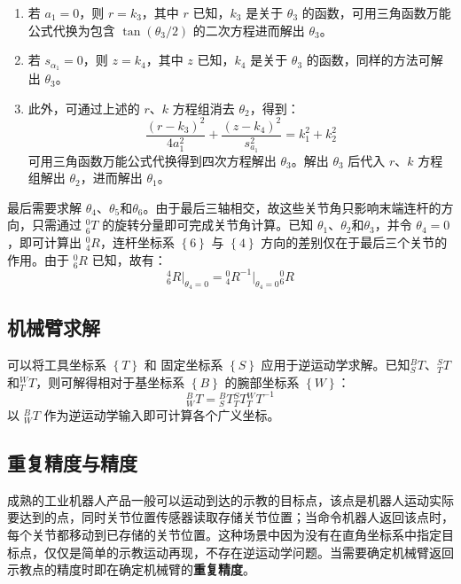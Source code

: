 \documentclass[cn,11pt,chinese,blue,bibstyle=ieeetr]{elegantbook}
\begin{document}
\begin{enumerate}
	\item 若 $a_1=0$，则 $r=k_3$，其中 $r$ 已知，$k_3$ 是关于 $\theta_3$ 的函数，可用三角函数万能公式代换为包含 $\tan(\theta_3/2)$ 的二次方程进而解出 $\theta_3$。
	\item 若 $s_{\alpha_1}=0$，则 $z=k_4$，其中 $z$ 已知，$k_4$ 是关于 $\theta_3$ 的函数，同样的方法可解出 $\theta_3$。
	\item 此外，可通过上述的 $r$、$k$ 方程组消去 $\theta_2$，得到：
	\begin{equation}
		\frac{(r-k_3)^2}{4a_1^2} + \frac{(z-k_4)^2}{s_{a_1}^2} = k_1^2 + k_2^2
	\end{equation}
	可用三角函数万能公式代换得到四次方程解出 $\theta_3$。解出 $\theta_3$ 后代入 $r$、$k$ 方程组解出 $\theta_2$，进而解出 $\theta_1$。
\end{enumerate}

最后需要求解 $\theta_4$、$\theta_5$和$\theta_6$。由于最后三轴相交，故这些关节角只影响末端连杆的方向，只需通过 ${^0_6}T$ 的旋转分量即可完成关节角计算。已知 $\theta_1$、$\theta_2$和$\theta_3$，并令  $\theta_4 = 0$，即可计算出 $^0_4R$，连杆坐标系 $\left\{6\right\}$ 与 $\left\{4\right\}$ 方向的差别仅在于最后三个关节的作用。由于 ${^0_6}R$ 已知，故有：
\begin{equation}
	{^4_6}R \lvert_{\theta_4 = 0} = {^0_4}R^{-1}\lvert_{\theta_4 = 0} {^0_6}R
\end{equation}


\subsection{机械臂求解}
可以将工具坐标系 $\left\{T\right\}$ 和 固定坐标系 $\left\{S\right\}$ 应用于逆运动学求解。已知${^B_S}T$、${^S_T}T$和${^W_T}T$，则可解得相对于基坐标系 $\left\{B\right\}$ 的腕部坐标系 $\left\{W\right\}$：
\begin{equation}
	{^B_W}T = {^B_S}T {^S_T}T {^W_T}T^{-1}
\end{equation}
以 ${^B_W}T$ 作为逆运动学输入即可计算各个广义坐标。


\subsection{重复精度与精度}
成熟的工业机器人产品一般可以运动到达的示教的目标点，该点是机器人运动实际要达到的点，同时关节位置传感器读取存储关节位置；当命令机器人返回该点时，每个关节都移动到已存储的关节位置。这种场景中因为没有在直角坐标系中指定目标点，仅仅是简单的示教运动再现，不存在逆运动学问题。当需要确定机械臂返回示教点的精度时即在确定机械臂的\textbf{重复精度}。
\end{document}
